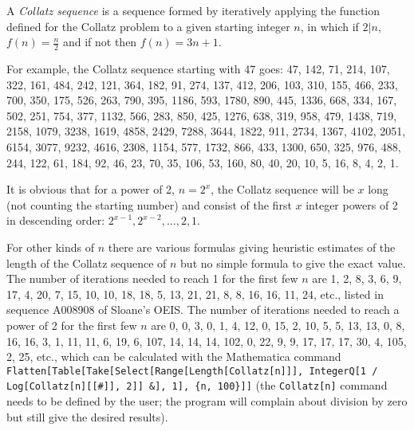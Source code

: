 \documentclass[12pt]{article}
\begin{document}
A {\em Collatz sequence} is a sequence formed by iteratively applying the function defined for the Collatz problem to a given starting integer $n$, in which if $2|n$, $f(n) = \frac{n}{2}$ and if not then $f(n) = 3n + 1$.

For example, the Collatz sequence starting with 47 goes: 47, 142, 71, 214, 107, 322, 161, 484, 242, 121, 364, 182, 91, 274, 137, 412, 206, 103, 310, 155, 466, 233, 700, 350, 175, 526, 263, 790, 395, 1186, 593, 1780, 890, 445, 1336, 668, 334, 167, 502, 251, 754, 377, 1132, 566, 283, 850, 425, 1276, 638, 319, 958, 479, 1438, 719, 2158, 1079, 3238, 1619, 4858, 2429, 7288, 3644, 1822, 911, 2734, 1367, 4102, 2051, 6154, 3077, 9232, 4616, 2308, 1154, 577, 1732, 866, 433, 1300, 650, 325, 976, 488, 244, 122, 61, 184, 92, 46, 23, 70, 35, 106, 53, 160, 80, 40, 20, 10, 5, 16, 8, 4, 2, 1.

It is obvious that for a power of 2, $n = 2^x$, the Collatz sequence will be $x$ long (not counting the starting number) and consist of the first $x$ integer powers of 2 in descending order: $2^{x - 1}, 2^{x - 2}, \ldots, 2, 1$.

For other kinds of $n$ there are various formulas giving heuristic estimates of the length of the Collatz sequence of $n$ but no simple formula to give the exact value. The number of iterations needed to reach 1 for the first few $n$ are 1, 2, 8, 3, 6, 9, 17, 4, 20, 7, 15, 10, 10, 18, 18, 5, 13, 21, 21, 8, 8, 16, 16, 11, 24, etc., listed in sequence A008908 of Sloane's OEIS. The number of iterations needed to reach a power of 2 for the first few $n$ are 0, 0, 3, 0, 1, 4, 12, 0, 15, 2, 10, 5, 5, 13, 13, 0, 8, 16, 16, 3, 1, 11, 11, 6, 19, 6, 107, 14, 14, 14, 102, 0, 22, 9, 9, 17, 17, 17, 30, 4, 105, 2, 25, etc., which can be calculated with the Mathematica command \verb=Flatten[Table[Take[Select[Range[Length[Collatz[n]]], IntegerQ[1 / Log[Collatz[n][[#]], 2]] &], 1], {n, 100}]]= (the \verb=Collatz[n]= command needs to be defined by the user; the program will complain about division by zero but still give the desired results).
\end{document}
